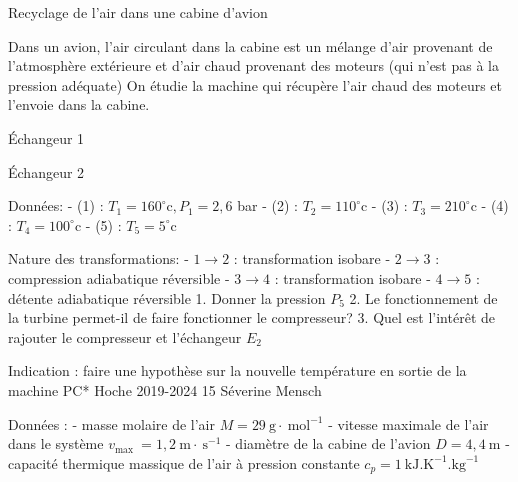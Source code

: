 
\begin{exo}[PC][1][colle]{Recyclage de l'air dans une cabine d'avion}

Dans un avion, l'air circulant dans la cabine est un mélange d'air provenant de l'atmosphère extérieure et d'air chaud provenant des moteurs (qui n'est pas à la pression adéquate)
On étudie la machine qui récupère l'air chaud des moteurs et l'envoie dans la cabine.

Échangeur 1

Échangeur 2

Données:
- (1) : $T_1=160^{\circ} \mathrm{c}, P_1=2,6$ bar
- (2) : $T_2=110^{\circ} \mathrm{c}$
- (3) : $T_3=210^{\circ} \mathrm{c}$
- (4) : $T_4=100^{\circ} \mathrm{c}$
- (5) : $T_5=5^{\circ} \mathrm{c}$

Nature des transformations:
- $1 \rightarrow 2$ : transformation isobare
- $2 \rightarrow 3$ : compression adiabatique réversible
- $3 \rightarrow 4$ : transformation isobare
- $4 \rightarrow 5$ : détente adiabatique réversible
1. Donner la pression $P_5$
2. Le fonctionnement de la turbine permet-il de faire fonctionner le compresseur?
3. Quel est l'intérêt de rajouter le compresseur et l'échangeur $E_2$

Indication : faire une hypothèse sur la nouvelle température en sortie de la machine
PC* Hoche 2019-2024
15
Séverine Mensch

Données :
- masse molaire de l'air $M=29 \mathrm{~g} \cdot \mathrm{~mol}^{-1}$
- vitesse maximale de l'air dans le système $v_{\text {max }}=1,2 \mathrm{~m} \cdot \mathrm{~s}^{-1}$
- diamètre de la cabine de l'avion $D=4,4 \mathrm{~m}$
- capacité thermique massique de l'air à pression constante $c_p=1 \mathrm{~kJ} . \mathrm{K}^{-1} . \mathrm{kg}^{-1}$
\end{exo}

